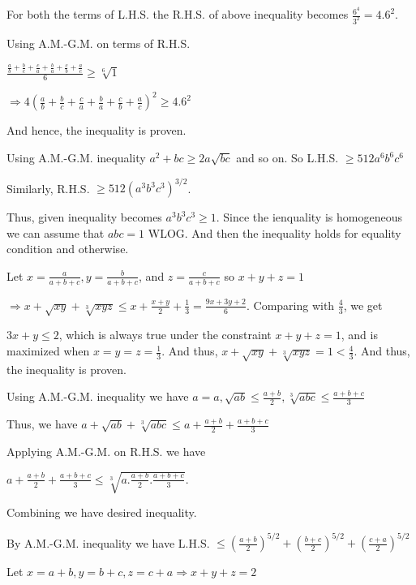   For both the terms of L.H.S. the R.H.S. of above inequality becomes $\frac{6^4}{3^2} = 4.6^2$.

  Using A.M.-G.M. on terms of R.H.S.

  $\displaystyle \frac{\frac{a}{b} + \frac{b}{c} + \frac{c}{a} + \frac{b}{a} + \frac{c}{b}
    + \frac{a}{c}}{6}\geq \sqrt[6]{1}$

  $\Rightarrow 4\left(\frac{a}{b} + \frac{b}{c} + \frac{c}{a} + \frac{b}{a} + \frac{c}{b}
  + \frac{a}{c}\right)^2\geq 4.6^2$

  And hence, the inequality is proven.
\item Using A.M.-G.M. inequality $a^2 + bc\geq 2a\sqrt{bc}$ and so on. So L.H.S. $\geq512a^6b^6c^6$

  Similarly, R.H.S. $\geq 512 (a^3b^3c^3)^{3/2}$.

  Thus, given inequality becomes $a^3b^3c^3\geq 1$. Since the ienquality is homogeneous we can assume that
  $abc = 1$ WLOG. And then the inequality holds for equality condition and otherwise.
\item Let $x = \frac{a}{a+ b + c}, y = \frac{b}{a + b + c}$, and $z = \frac{c}{a + b + c}$ so $x + y + z =
  1$

  $\Rightarrow x + \sqrt{xy} + \sqrt[3]{xyz} \leq x + \frac{x + y}{2} + \frac{1}{3} = \frac{9x + 3y +
    2}{6}$. Comparing with $\frac{4}{3}$, we get

  $3x + y\leq 2$, which is always true under the constraint $x + y + z = 1$, and is maximized when $x = y =
  z = \frac{1}{3}$. And thus, $x + \sqrt{xy} + \sqrt[3]{xyz} = 1 < \frac{4}{3}$. And thus, the inequality is
  proven.
\item Using A.M.-G.M. inequality we have $a = a, \sqrt{ab}\leq \frac{a + b}{2}, \sqrt[3]{abc}\leq \frac{a +
  b + c}{3}$

  Thus, we have $a + \sqrt{ab} + \sqrt[3]{abc}\leq a + \frac{a + b}{2} + \frac{a + b + c}{3}$

  Applying A.M.-G.M. on R.H.S. we have

  $a + \frac{a + b}{2} + \frac{a + b + c}{3}\leq \sqrt[3]{a.\frac{a + b}{2}.\frac{a + b + c}{3}}$.

  Combining we have desired inequality.
\item By A.M.-G.M. inequality we have L.H.S. $\leq \left(\frac{a + b}{2}\right)^{5/2} + \left(\frac{b +
  c}{2}\right)^{5/2} + \left(\frac{c + a}{2}\right)^{5/2}$

  Let $x = a + b, y = b + c, z = c + a\Rightarrow x + y + z = 2$

